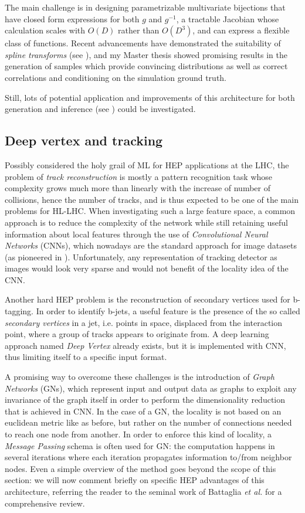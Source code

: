 \documentclass{scrartcl} %
\begin{document}
	The main challenge is in designing parametrizable multivariate bijections that have closed form expressions for both $g$ and $g^{-1}$, a tractable Jacobian whose calculation scales with $O(D)$ rather than $O(D^3)$, and can express a flexible class of functions. Recent advancements have demonstrated the suitability of \emph{spline transforms} (see \cite{durkan}), and my Master thesis showed promising results in the generation of samples which provide convincing distributions as well as correct correlations and conditioning on the simulation ground truth.
	
	Still, lots of potential application and improvements of this architecture for both generation and inference (see \cite{green2020complete}) could be investigated.

\subsection*{Deep vertex and tracking}

Possibly considered the holy grail of ML for HEP applications at the LHC, the problem of \emph{track reconstruction} is mostly a pattern recognition task whose complexity grows much more than linearly with the increase of number of collisions, hence the number of tracks, and is thus expected to be one of the main problems for HL-LHC. When investigating such a large feature space, a common approach is to reduce the complexity of the network while still retaining useful information about local features through the use of \emph{Convolutional Neural Networks} (CNNs), which nowadays are the standard approach for image datasets (as pioneered in \cite{simonyan2015deep}).
Unfortunately, any representation of tracking detector as images
would look very sparse and would not benefit of the locality idea of the CNN. 

Another hard HEP problem is the reconstruction of secondary vertices used for b-tagging. In order to identify b-jets, a useful feature is the presence of the so called \emph{secondary
vertices} in a jet, i.e. points in space, displaced from the interaction point, where a group of tracks
appears to originate from. A deep learning approach named \emph{Deep Vertex} already exists, but it is implemented with CNN, thus limiting itself to a specific input format.

A promising way to overcome these challenges is the introduction of \emph{Graph Networks} (GNs), which represent input and output data as graphs to exploit any invariance of the graph itself in order to perform the dimensionality reduction that is achieved in CNN. In the case of a GN, the locality is not based on an euclidean metric like as before, but rather on the number of connections needed to reach one node from another. In order to enforce this kind of locality, a \emph{Message Passing} schema is often used for GN: the computation happens in several iterations where each iteration propagates information to/from neighbor nodes. Even a simple overview of the method goes beyond the scope of this section: we will now comment briefly on specific HEP advantages of this architecture, referring the reader to the seminal work of Battaglia \emph{et al.} \cite{battaglia2018relational} for a comprehensive review.
\end{document}
